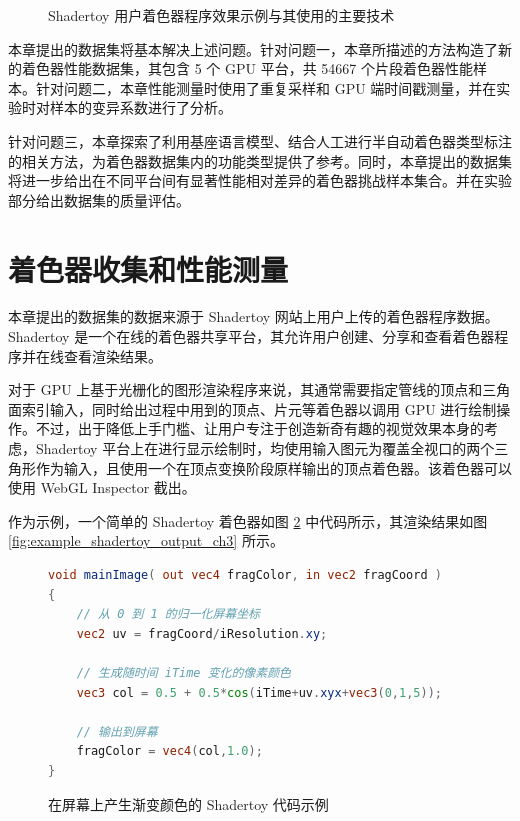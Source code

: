 {\begin{figure}[htbp]
  \caption{Shadertoy 用户\cite{ShdrToyUser1, ShdrToyUser2}着色器程序效果示例与其使用的主要技术}
  \label{fig:shadertoy_gallery_ch3}
\end{figure}


本章提出的数据集将基本解决上述问题。针对问题一，本章所描述的方法构造了新的着色器性能数据集，其包含 5 个 GPU 平台，共 54667 个片段着色器性能样本。针对问题二，本章性能测量时使用了重复采样和 GPU 端时间戳测量，并在实验时对样本的变异系数进行了分析。}{\added 针对问题三，本章探索了利用基座语言模型、结合人工进行半自动着色器类型标注的相关方法，为着色器数据集内的功能类型提供了参考。同时，本章提出的数据集将进一步给出在不同平台间有显著性能相对差异的着色器挑战样本集合。并在实验部分给出数据集的质量评估。
}

\section{{\amend 着色器收集和性能测量}}

{\added 本章提出的数据集的数据来源于 Shadertoy\cite{Shadertoy} 网站上用户上传的着色器程序数据。} Shadertoy 是一个在线{\added 的着色器共享}平台，{\amend 其}允许用户创建、分享和查看着色器程序{\amend 并在线查看}渲染结果。

{\added 对于 GPU 上基于光栅化的图形渲染程序来说，其通常需要}指定管线的顶点和三角面索引输入，同时给出过程中用到的顶点、片元等着色器{\amend 以调用 GPU 进行绘制操作。}不过，出于降低上手门槛、让用户专注于创造新奇有趣的视觉效果本身的考虑，Shadertoy 平台上在进行显示绘制时，均{\amend 使用输入图元为覆盖全视口的两个三角形作为输入，且使用一个在顶点变换阶段原样输出的顶点着色器。}{\added 该着色器可以使用 WebGL Inspector \cite{WebGLInspector} 截出。}

作为示例，一个简单的 Shadertoy 着色器如图 \ref{fig:example_glsl_shadertoy_code_ch3} 中代码所示，其渲染结果如图 \ref{fig:example_shadertoy_output_ch3} 所示。

\begin{figure}  %
\centering

\begin{lstlisting}[language=GLSL]
void mainImage( out vec4 fragColor, in vec2 fragCoord )
{
    // 从 0 到 1 的归一化屏幕坐标
    vec2 uv = fragCoord/iResolution.xy;

    // 生成随时间 iTime 变化的像素颜色
    vec3 col = 0.5 + 0.5*cos(iTime+uv.xyx+vec3(0,1,5));

    // 输出到屏幕
    fragColor = vec4(col,1.0);
}
\end{lstlisting}
\caption{在屏幕上产生渐变颜色的 Shadertoy 代码示例}
\label{fig:example_glsl_shadertoy_code_ch3}
\end{figure}

